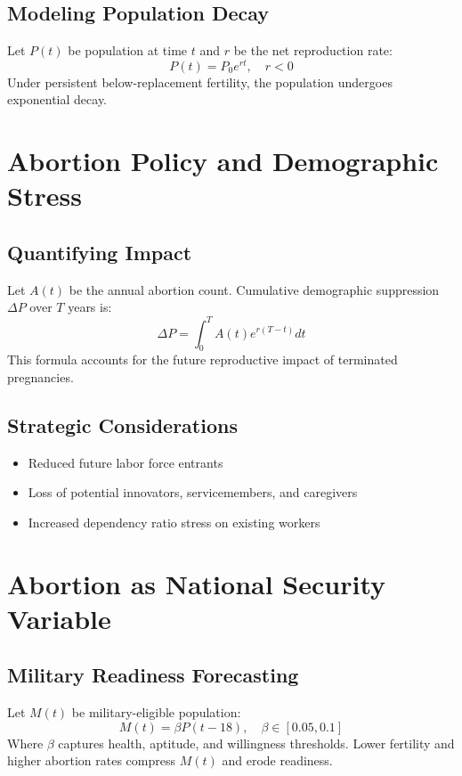 \documentclass[11pt]{article}
\begin{document}
\subsection{Modeling Population Decay}
Let $P(t)$ be population at time $t$ and $r$ be the net reproduction rate:
\begin{equation}
P(t) = P_0 e^{rt}, \quad r < 0 
\end{equation}
Under persistent below-replacement fertility, the population undergoes exponential decay.

\section{Abortion Policy and Demographic Stress}
\subsection{Quantifying Impact}
Let $A(t)$ be the annual abortion count. Cumulative demographic suppression $\Delta P$ over $T$ years is:
\begin{equation}
\Delta P = \int_0^T A(t) e^{r(T-t)} dt
\end{equation}
This formula accounts for the future reproductive impact of terminated pregnancies.

\subsection{Strategic Considerations}
\begin{itemize}
    \item Reduced future labor force entrants
    \item Loss of potential innovators, servicemembers, and caregivers
    \item Increased dependency ratio stress on existing workers
\end{itemize}

\section{Abortion as National Security Variable}
\subsection{Military Readiness Forecasting}
Let $M(t)$ be military-eligible population:
\begin{equation}
M(t) = \beta P(t-18), \quad \beta \in [0.05, 0.1]
\end{equation}
Where $\beta$ captures health, aptitude, and willingness thresholds. Lower fertility and higher abortion rates compress $M(t)$ and erode readiness.
\end{document}
